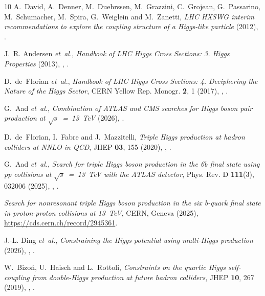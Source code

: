 \documentclass{SciPost}
\begin{document}
\begin{thebibliography}{10}
A.~David, A.~Denner, M.~Duehrssen, M.~Grazzini, C.~Grojean, G.~Passarino, M.~Schumacher, M.~Spira, G.~Weiglein and M.~Zanetti,
\newblock \emph{{LHC HXSWG interim recommendations to explore the coupling structure of a Higgs-like particle}}  (2012),
\newblock {}.

J.~R. Andersen \emph{et~al.},
\newblock \emph{{Handbook of LHC Higgs Cross Sections: 3. Higgs Properties}}  (2013),
\newblock {},
\newblock {}.

D.~de~Florian \emph{et~al.},
\newblock \emph{{Handbook of LHC Higgs Cross Sections: 4. Deciphering the Nature of the Higgs Sector}},
\newblock CERN Yellow Rep. Monogr. \textbf{2}, 1 (2017),
\newblock {},
\newblock {}.

G.~Aad \emph{et~al.},
\newblock \emph{{Combination of ATLAS and CMS searches for Higgs boson pair production at $\sqrt{s}$~=~13~TeV}}  (2026),
\newblock {}.

D.~de~Florian, I.~Fabre and J.~Mazzitelli,
\newblock \emph{{Triple Higgs production at hadron colliders at NNLO in QCD}},
\newblock JHEP \textbf{03}, 155 (2020),
\newblock {},
\newblock {}.

G.~Aad \emph{et~al.},
\newblock \emph{{Search for triple Higgs boson production in the 6b final state using pp collisions at $\sqrt{s}$~=~13~TeV with the ATLAS detector}},
\newblock Phys. Rev. D \textbf{111}(3), 032006 (2025),
\newblock {},
\newblock {}.

\emph{{Search for nonresonant triple Higgs boson production in the six b-quark final state in proton-proton collisions at 13~TeV}},
\newblock CERN, Geneva (2025),
\newblock \href{https://cds.cern.ch/record/2945361}{https://cds.cern.ch/record/2945361}.

J.-L. Ding \emph{et~al.},
\newblock \emph{{Constraining the Higgs potential using multi-Higgs production}}  (2026),
\newblock {},
\newblock {}.

W.~Bizo\'n, U.~Haisch and L.~Rottoli,
\newblock \emph{{Constraints on the quartic Higgs self-coupling from double-Higgs production at future hadron colliders}},
\newblock JHEP \textbf{10}, 267 (2019),
\newblock {},
\newblock {}.


\end{thebibliography}
\end{document}
